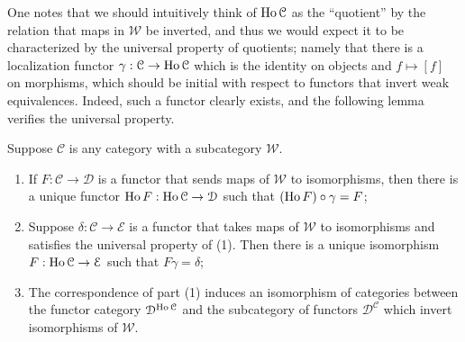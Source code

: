 One notes that we should intuitively think of $\operatorname{Ho} \mathcal{C} $ as the ``quotient'' by the relation that maps in $\mathcal{W} $ be inverted, and thus we would expect it to be characterized by the universal property of quotients; namely that there is a localization functor $\gamma : \mathcal{C}  \to \operatorname{Ho} \mathcal{C} $ which is the identity on objects and $f\mapsto [f]$ on morphisms, which should be initial with respect to functors that invert weak equivalences. Indeed, such a functor clearly exists, and the following lemma verifies the universal property.

\begin{lemma}\label{1.2.4}
	Suppose $\mathcal{C} $ is any category with a subcategory $\mathcal{W} $.
	\begin{enumerate}
		\item If $F : \mathcal{C}  \to \mathcal{D} $ is a functor that sends maps of $\mathcal{W} $ to isomorphisms, then there is a unique functor $\operatorname{Ho} F : \operatorname{Ho} \mathcal{C}  \to \mathcal{D} $ such that $(\operatorname{Ho} F)\circ \gamma=F$;
		\item Suppose $\delta : \mathcal{C}  \to \mathcal{E} $ is a functor that takes maps of $\mathcal{W} $ to isomorphisms and satisfies the universal property of (1). Then there is a unique isomorphism $F : \operatorname{Ho} \mathcal{C}  \to \mathcal{E} $ such that $F\gamma=\delta$;
		\item The correspondence of part (1) induces an isomorphism of categories between the functor category $\mathcal{D} ^{\operatorname{Ho} \mathcal{C} } $ and the subcategory of functors $\mathcal{D} ^\mathcal{C} $ which invert isomorphisms of $\mathcal{W} $.
	\end{enumerate}
\end{lemma}
